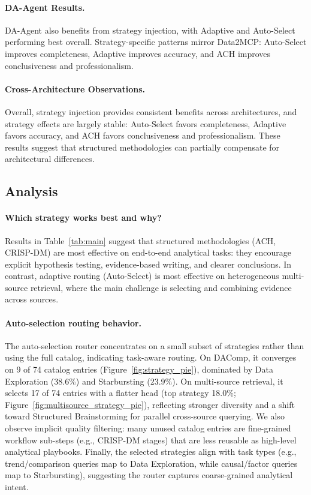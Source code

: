 \paragraph{DA-Agent Results.}
DA-Agent also benefits from strategy injection, with Adaptive and Auto-Select performing best overall. Strategy-specific patterns mirror Data2MCP: Auto-Select improves completeness, Adaptive improves accuracy, and ACH improves conclusiveness and professionalism.

\paragraph{Cross-Architecture Observations.}
Overall, strategy injection provides consistent benefits across architectures, and strategy effects are largely stable: Auto-Select favors completeness, Adaptive favors accuracy, and ACH favors conclusiveness and professionalism. These results suggest that structured methodologies can partially compensate for architectural differences.

\subsection{Analysis}
\label{sec:analysis}

\paragraph{Which strategy works best and why?}
Results in Table~\ref{tab:main} suggest that structured methodologies (ACH, CRISP-DM) are most effective on end-to-end analytical tasks: they encourage explicit hypothesis testing, evidence-based writing, and clearer conclusions. In contrast, adaptive routing (Auto-Select) is most effective on heterogeneous multi-source retrieval, where the main challenge is selecting and combining evidence across sources.

\paragraph{Auto-selection routing behavior.}
The auto-selection router concentrates on a small subset of strategies rather than using the full catalog, indicating task-aware routing. On DAComp, it converges on 9 of 74 catalog entries (Figure~\ref{fig:strategy_pie}), dominated by Data Exploration (38.6\%) and Starbursting (23.9\%). On multi-source retrieval, it selects 17 of 74 entries with a flatter head (top strategy 18.0\%; Figure~\ref{fig:multisource_strategy_pie}), reflecting stronger diversity and a shift toward Structured Brainstorming for parallel cross-source querying. We also observe implicit quality filtering: many unused catalog entries are fine-grained workflow sub-steps (e.g., CRISP-DM stages) that are less reusable as high-level analytical playbooks. Finally, the selected strategies align with task types (e.g., trend/comparison queries map to Data Exploration, while causal/factor queries map to Starbursting), suggesting the router captures coarse-grained analytical intent.

